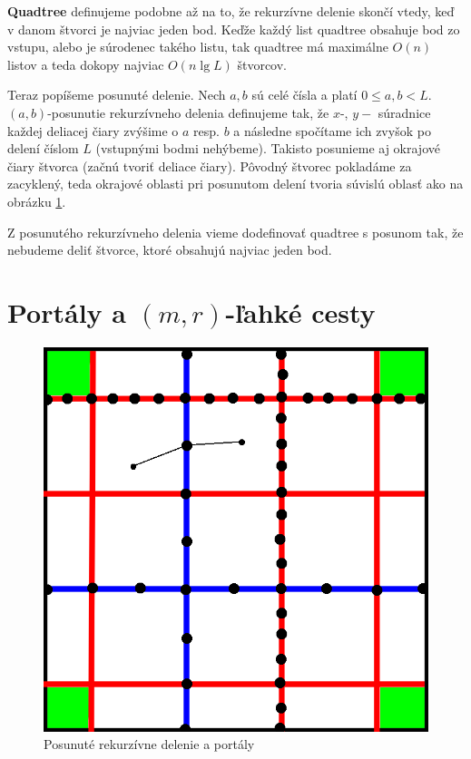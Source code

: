 {\bf Quadtree} definujeme podobne 
až na to, že rekurzívne delenie skončí vtedy, keď v danom štvorci je najviac jeden bod. Keďže každý
list quadtree obsahuje bod zo vstupu, alebo je súrodenec takého listu, tak quadtree má maximálne
$O(n)$ listov a teda dokopy najviac $O(n \lg L)$ štvorcov.

\smallskip

Teraz popíšeme posunuté delenie. Nech $a, b$ sú celé čísla a platí $0 \leq a, b < L$.
$(a,b)$-posunutie rekurzívneho delenia definujeme tak, že $x$-, $y-$ súradnice každej deliacej čiary
zvýšime o $a$ resp. $b$ a následne spočítame ich zvyšok po delení číslom $L$ (vstupnými bodmi
nehýbeme). Takisto posunieme aj okrajové čiary štvorca (začnú tvoriť deliace čiary). Pôvodný štvorec
pokladáme za zacyklený, teda okrajové oblasti pri posunutom delení tvoria súvislú oblasť ako na
obrázku \ref{fig:quadtree}.

Z posunutého rekurzívneho delenia vieme dodefinovať quadtree s posunom tak, že nebudeme deliť
štvorce, ktoré obsahujú najviac jeden bod.

\section{Portály a $(m,r)$-ľahké cesty}

\begin{figure}[h]
\centering
\includegraphics{img/quadtree.png}
\caption{Posunuté rekurzívne delenie a portály}
\label{fig:quadtree}
\end{figure}

